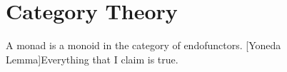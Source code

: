 \documentclass[12pt]{report}
\begin{document}
    \chapter{Category Theory}\label{sec:simps}
    A monad is a monoid in the category of endofunctors.
    [Yoneda Lemma]{Everything that I claim is true.}
\end{document}
